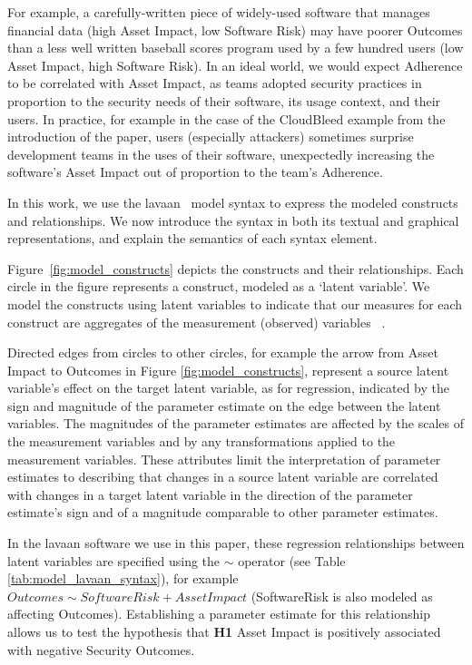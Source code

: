 For example, a carefully-written piece of widely-used software that manages financial data (high Asset Impact, low Software Risk) may have poorer Outcomes than a less well written baseball scores program used by a few hundred users (low Asset Impact, high Software Risk). In an ideal world, we would expect Adherence to be correlated with Asset Impact, as teams adopted security practices in proportion to the security needs of their software, its usage context, and their users. In practice, for example in the case of the CloudBleed example from the introduction of the paper, users (especially attackers) sometimes surprise development teams in the uses of their software, unexpectedly increasing the software's Asset Impact out of proportion to the team's Adherence. 

In this work, we use the lavaan~\cite{roseel2012lavaan} model syntax to express the modeled constructs and relationships.  We now introduce the syntax in both its textual and graphical representations, and explain the semantics of each syntax element.

Figure~\ref{fig:model_constructs} depicts the constructs and their relationships.  Each circle in the figure represents a construct, modeled as a `latent variable'. We model the constructs using latent variables to indicate that our measures for each construct are aggregates of the measurement (observed) variables ~\cite{kline2015principles,borsboom2008latent}. 

Directed edges from circles to other circles, for example the arrow from Asset Impact to Outcomes in Figure \ref{fig:model_constructs}, represent a source latent variable's effect on the target latent variable, as for regression, indicated by the sign and magnitude of the parameter estimate on the edge between the latent variables. The magnitudes of the parameter estimates are affected by the scales of the measurement variables and by any transformations applied to the measurement variables. These attributes limit the interpretation of parameter estimates to describing that changes in a source latent variable are correlated with changes in a target latent variable in the direction of the parameter estimate's sign and of a magnitude comparable to other parameter estimates. 

In the lavaan software we use in this paper, these regression relationships between latent variables are specified using the $\sim$  operator (see Table \ref{tab:model_lavaan_syntax}), for example $Outcomes \sim SoftwareRisk + AssetImpact$ (SoftwareRisk is also modeled as affecting Outcomes). Establishing a parameter estimate for this relationship allows us to test the hypothesis that \textbf{H1} Asset Impact is positively associated with negative Security Outcomes.

